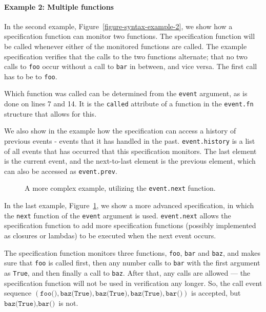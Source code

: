 \paragraph{Example 2: Multiple functions}
In the second example, Figure~\ref{figure-syntax-example-2}, we show how a
specification function can monitor two functions. The specification function
will be called whenever either of the monitored functions are called. The
example specification verifies that the calls to the two functions alternate;
that no two calls to \texttt{foo} occur without a call to \texttt{bar} in
between, and vice versa. The first call has to be to \texttt{foo}.

Which function was called can be determined from the \texttt{event} argument,
as is done on lines 7 and 14. It is the \texttt{called} attribute of a function
in the \texttt{event.fn} structure that allows for this.

We also show in the example how the specification can access a history of
previous events - events that it has handled in the past.
\texttt{event.history} is a list of all events that has occurred that this
specification monitors. The last element is the current event, and the
next-to-last element is the previous element, which can also be accessed as
\texttt{event.prev}.

\begin{figure}[h!]
	\begin{center}
	\begin{minipage}{0.7\textwidth}
	
	\end{minipage}
	\end{center}

  \caption{A more complex example, utilizing the \texttt{event.next} function.}
	\label{figure-syntax-example-3}
\end{figure}

In the last example, Figure~\ref{figure-syntax-example-3}, we show a more
advanced specification, in which the \texttt{next} function of the
\texttt{event} argument is used. \texttt{event.next} allows the specification
function to add more specification functions (possibly implemented as closures
or lambdas) to be executed when the next event occurs.

The specification function monitors three functions, \texttt{foo}, \texttt{bar}
and \texttt{baz}, and makes sure that \texttt{foo} is called first, then any
number calls to \texttt{bar} with the first argument as \texttt{True}, and then
finally a call to \texttt{baz}. After that, any calls are allowed --- the
specification function will not be used in verification any longer. So, the
call event sequence $(\texttt{foo()}, \texttt{baz(True)}, \texttt{baz(True)},
\texttt{baz(True)}, \texttt{bar()})$ is accepted, but $\texttt{baz(True)},
\texttt{bar()}$ is not.

